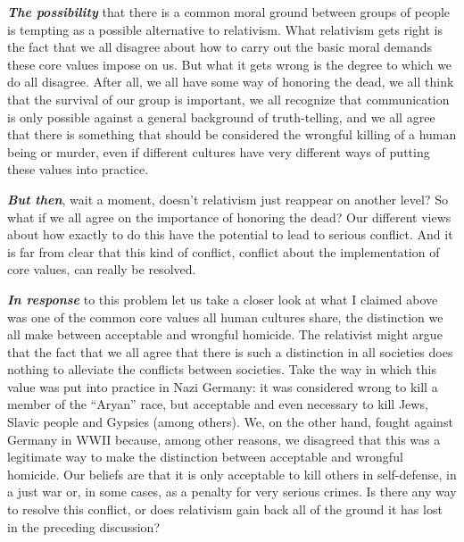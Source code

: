 \documentclass[12pt, openany]{book}
\makeatletter
\newenvironment{kframe}{%
\medskip{}
\setlength{\fboxsep}{.8em}
 \def\at@end@of@kframe{}%
 \ifinner\ifhmode%
  \def\at@end@of@kframe{\end{minipage}}%
  \begin{minipage}{\columnwidth}%
 \fi\fi%
 \def\FrameCommand##1{\hskip\@totalleftmargin \hskip-\fboxsep
 \colorbox{shadecolor}{##1}\hskip-\fboxsep
     \hskip-\linewidth \hskip-\@totalleftmargin \hskip\columnwidth}%
 \MakeFramed {\advance\hsize-\width
   \@totalleftmargin\z@ \linewidth\hsize
   \@setminipage}}%
 {\par\unskip\endMakeFramed%
 \at@end@of@kframe}
\newenvironment{rmdblock}[1]
  {
  \begin{itemize}
  \renewcommand{\labelitemi}{
    \raisebox{-.7\height}[0pt][0pt]{
      {\setkeys{Gin}{width=3em,keepaspectratio}\texttt{[image: img/\#1]}}
    }
  }
  \setlength{\fboxsep}{1em}
  \begin{kframe}
  \item
  }
  {
  \end{kframe}
  \end{itemize}
  }
\newenvironment{rmdcaution}
  {\begin{rmdblock}{caution}}
  {\end{rmdblock}}
\makeatother
\begin{document}
\textbf{\emph{The possibility}} that there is a common moral ground between groups of people is tempting as a possible alternative to relativism. What relativism gets right is the fact that we all disagree about how to carry out the basic moral demands these core values impose on us. But what it gets wrong is the degree to which we do all disagree. After all, we all have some way of honoring the dead, we all think that the survival of our group is important, we all recognize that communication is only possible against a general background of truth-telling, and we all agree that there is something that should be considered the wrongful killing of a human being or murder, even if different cultures have very different ways of putting these values into practice.

\begin{rmdcaution}

\textbf{\emph{But then}}, wait a moment, doesn't relativism just reappear on another level? So what if we all agree on the importance of honoring the dead? Our different views about how exactly to do this have the potential to lead to serious conflict. And it is far from clear that this kind of conflict, conflict about the implementation of core values, can really be resolved.

\end{rmdcaution}

\textbf{\emph{In response}} to this problem let us take a closer look at what I claimed above was one of the common core values all human cultures share, the distinction we all make between acceptable and wrongful homicide. The relativist might argue that the fact that we all agree that there is such a distinction in all societies does nothing to alleviate the conflicts between societies. Take the way in which this value was put into practice in Nazi Germany: it was considered wrong to kill a member of the ``Aryan'' race, but acceptable and even necessary to kill Jews, Slavic people and Gypsies (among others). We, on the other hand, fought against Germany in WWII because, among other reasons, we disagreed that this was a legitimate way to make the distinction between acceptable and wrongful homicide. Our beliefs are that it is only acceptable to kill others in self-defense, in a just war or, in some cases, as a penalty for very serious crimes. Is there any way to resolve this conflict, or does relativism gain back all of the ground it has lost in the preceding discussion?
\end{document}
